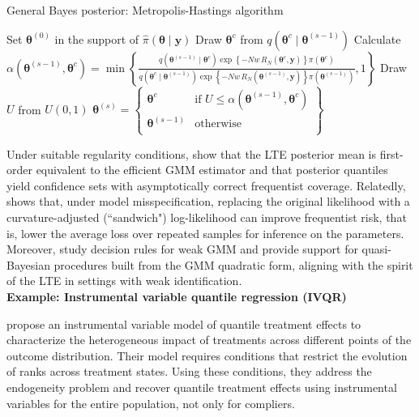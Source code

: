 \begin{algorithm}[h!]
	\caption{General Bayes posterior: Metropolis-Hastings algorithm}\label{Alg:GibbsPosteior}
	\begin{algorithmic}[1]
		\State Set $\bm{\theta}^{(0)}$ in the support of $\hat{\pi}(\bm{\theta}\mid \bm{y})$  		 			
		\State Draw $\bm{\theta}^{c}$ from $q(\bm{\theta}^{c}\mid \bm{\theta}^{(s-1)})$
		\State Calculate $\alpha(\bm{\theta}^{(s-1)}, \bm{\theta}^{c}) = 
		\min\left\{\frac{q(\bm{\theta}^{(s-1)} \mid  \bm{\theta}^{c}) \exp\left\{-Nw\,R_N(\boldsymbol{\theta}^c,\mathbf{y})\right\}\pi(\boldsymbol{\theta}^c)}{q(\bm{\theta}^{c} \mid  \bm{\theta}^{(s-1)}) \exp\left\{-Nw\,R_N(\boldsymbol{\theta}^{(s-1)},\mathbf{y})\right\}\pi(\boldsymbol{\theta}^{(s-1)})}, 1\right\}$
		\State Draw $U$ from $U(0,1)$
		\State $\bm{\theta}^{(s)}=\begin{Bmatrix}
			\bm{\theta}^{c} & \text{if } U\leq \alpha(\bm{\theta}^{(s-1)}, \bm{\theta}^{c})\\
			\bm{\theta}^{(s-1)} & \text{otherwise}\\
		\end{Bmatrix}$
		\EndFor 
	\end{algorithmic} 
\end{algorithm}


Under suitable regularity conditions, \cite{chernozhukov2003mcmc} show that the LTE posterior mean is first-order equivalent to the efficient GMM estimator and that posterior quantiles yield confidence sets with asymptotically correct frequentist coverage. Relatedly, \cite{Muller2013SandwichBayes} shows that, under model misspecification, replacing the original likelihood with a curvature-adjusted (``sandwich") log-likelihood can improve frequentist risk, that is, lower the average loss over repeated samples for inference on the parameters. Moreover, \cite{andrews2022weakgmm} study decision rules for weak GMM and provide support for quasi-Bayesian procedures built from the GMM quadratic form, aligning with the spirit of the LTE in settings with weak identification.\\

\textbf{Example: Instrumental variable quantile regression (IVQR)}

\cite{Chernozhukov2005} propose an instrumental variable model of quantile treatment effects to characterize the heterogeneous impact of treatments across different points of the outcome distribution. Their model requires conditions that restrict the evolution of ranks across treatment states. Using these conditions, they address the endogeneity problem and recover quantile treatment effects using instrumental variables for the entire population, not only for compliers.  

